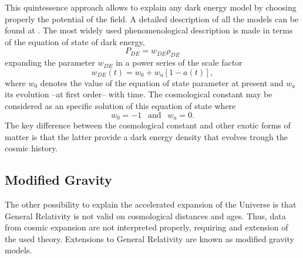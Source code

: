 This quintessence approach allows to explain any dark energy model by choosing properly the potential of the field. A detailed description of all the models can be found at \cite{2010deto.book.....A}. The most widely used phenomenological description is made in terms of the equation of state of dark energy,
\begin{equation}
P_{DE} = w_{DE}\rho_{DE}
\end{equation}
expanding the parameter $w_{DE}$ in a power series of the scale factor
\begin{equation}
w_{DE}(t) = w_0 +w_a[1-a(t)],
\end{equation}
where $w_0$ denotes the value of the equation of state parameter at present and $w_a$ its evolution --at first order-- with time. The cosmological constant may be considered as an specific solution of this equation of state where
\begin{equation}
w_0=-1\ \ \mbox{ and }\ \ w_a=0.
\end{equation}
The key difference between the cosmological constant and other exotic forms of matter is that the latter provide a dark energy density that evolves trough the cosmic history.

\subsection{Modified Gravity}
The other possibility to explain the accelerated expansion of the Universe is that General Relativity is not valid on cosmological distances and ages. Thus, data from cosmic expansion are not interpreted properly, requiring and extension of the used theory.  Extensions to General Relativity are known as modified gravity models.
\newline

